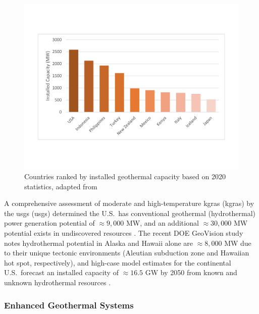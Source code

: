\begin{figure}
\centering
\includegraphics[width=.8\textwidth]{templates/images/Figure-IRENA_statistics.pdf}
\caption[Country rankings for installed geothermal capacity]{Countries ranked by installed geothermal capacity based on 2020 statistics, adapted from \protect\citep{irena_country_2021}}
\label{fig:irena-rank}
\end{figure}

A comprehensive assessment of moderate and high-temperature \acrlong{kgra}s (\acrshort{kgra}s) by the \acrlong{usgs} (\acrshort{usgs}) determined the U.S.\ has conventional geothermal (hydrothermal) power generation potential of $\approx9,000$ MW, and an additional $\approx30,000$ MW potential exists in undiscovered resources \citep{williams_assessment_2008}. The recent DOE GeoVision study notes hydrothermal potential in Alaska and Hawaii alone are $\approx8,000$ MW due to their unique tectonic environments (Aleutian subduction zone and Hawaiian hot spot, respectively), and high-case model estimates for the continental U.S.\ forecast an installed capacity of $\approx16.5$ GW by 2050 from known and unknown hydrothermal resources \citep{augustine_geovision_2019,hamm_overview_2019}.

\subsubsection{Enhanced Geothermal Systems}\label{ch2:egs}

